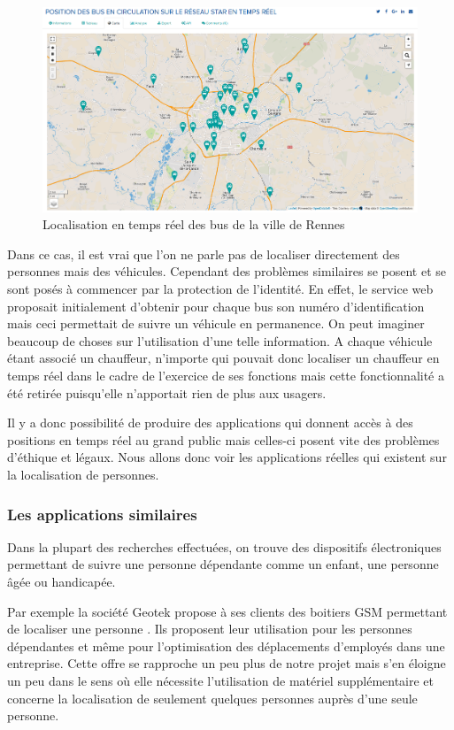\begin{figure}[H]
    \centering
    \includegraphics[width=\textwidth]{./img/rennes.png}
    \caption{Localisation en temps réel des bus de la ville de Rennes}
    \label{rennes}
\end{figure}

Dans ce cas, il est vrai que l’on ne parle pas de localiser directement des personnes mais des véhicules. Cependant des problèmes similaires se posent et se sont posés à commencer par la protection de l’identité. En effet, le service web proposait initialement d’obtenir pour chaque bus son numéro d’identification mais ceci permettait de suivre un véhicule en permanence. On peut imaginer beaucoup de choses sur l’utilisation d’une telle information. A chaque véhicule étant associé un chauffeur, n'importe qui pouvait donc localiser un chauffeur en temps réel dans le cadre de l'exercice de ses fonctions mais cette fonctionnalité a été retirée puisqu’elle n’apportait rien de plus aux usagers.

Il y a donc possibilité de produire des applications qui donnent accès à des positions en temps réel au grand public mais celles-ci posent vite des problèmes d’éthique et légaux. Nous allons donc voir les applications réelles qui existent sur la localisation de personnes.

\subsubsection{Les applications similaires}

Dans la plupart des recherches effectuées, on trouve des dispositifs électroniques permettant de suivre une personne dépendante comme un enfant, une personne âgée ou handicapée.

Par exemple la société Geotek propose à ses clients des boitiers GSM permettant de localiser une personne \cite{bibgeotek}. Ils proposent leur utilisation pour les personnes dépendantes et même pour l’optimisation des déplacements d’employés dans une entreprise. Cette offre se rapproche un peu plus de notre projet mais s’en éloigne un peu dans le sens où elle nécessite l’utilisation de matériel supplémentaire et concerne la localisation de seulement quelques personnes auprès d’une seule personne.

